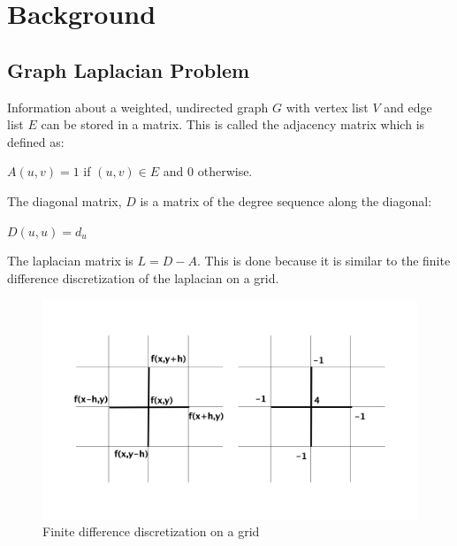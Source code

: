 \documentclass{article}
\begin{document}
\section{Background}
\subsection{Graph Laplacian Problem}
Information about a weighted, undirected graph $G$ with vertex list $V$ and edge list $E$ can be stored in a matrix. This is called the adjacency matrix which is defined as:\\
\begin{center} 
$A(u,v) = 1$ if $(u,v) \in E$ and $0$ otherwise.\\
\end{center}
The diagonal matrix, $D$ is a matrix of the degree sequence along the diagonal:\\
\begin{center}
$D(u,u) = d_u$
\end{center}
The laplacian matrix is $L = D-A$. This is done because it is similar to the finite difference discretization of the laplacian on a grid.\\
\begin{figure}[H]
\begin{center}
\includegraphics[width=\linewidth]{laplace.png}
  \caption{Finite difference discretization on a grid}
  \end{center}
  \end{figure}
 
\end{document}
